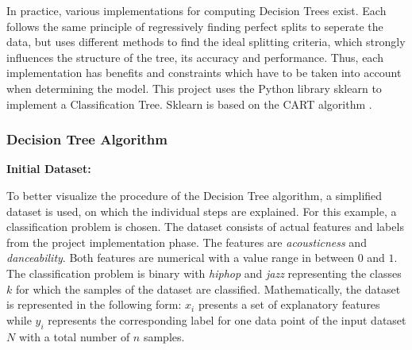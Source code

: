 
In practice, various implementations for computing Decision Trees exist. Each follows the same 
principle of regressively finding perfect splits to seperate the data, but uses different methods to find 
the ideal splitting criteria, which strongly influences the structure of the tree, its accuracy and 
performance. Thus, each implementation has benefits and constraints which have to be taken into account
when determining the model. This project uses the Python library sklearn to implement a Classification Tree. 
Sklearn is based on the \ac{CART} algorithm \cite{scikit-decision_tree}.


\subsubsection{Decision Tree Algorithm}

\textbf{Initial Dataset:}

To better visualize the procedure of the Decision Tree algorithm, a simplified dataset is used, 
on which the individual steps are explained. For this example, a classification problem is chosen. 
The dataset consists of actual features and labels from the project implementation phase. The 
features are \emph{acousticness} and \emph{danceability}. Both features are numerical with a value range 
in between \(0\) and \(1\). The classification problem is binary with \emph{hiphop} and \emph{jazz} representing 
the classes \(k\) for which the samples of the dataset are classified. Mathematically, the dataset 
is represented in the following form: \(x_{i}\) presents a set of explanatory features while \(y_{i}\) represents 
the corresponding label for one data point of the input dataset \(N\) with a total number of \(n\) 
samples.

